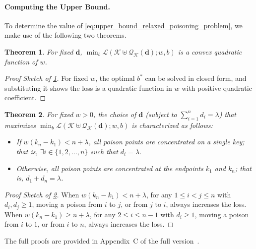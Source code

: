 \documentclass[acmsmall]{acmart}
\newtheorem{theorem}{Theorem}
\begin{document}
\paragraph{Computing the Upper Bound.}
To determine the value of \cref{eq:upper_bound_relaxed_poisoning_problem}, we make use of the following two theorems.
\begin{theorem_box}
\begin{theorem}
\label{thm:convexity_of_min_b_l_fixed_d}
For fixed $\bm{d}$,  $\min_{b} \mathcal{L}(\mathcal{K} \uplus \mathcal{Q}_\mathcal{K}(\bm{d}); w, b)$ is a convex quadratic function of $w$.
\end{theorem}
\end{theorem_box}
\begin{proof}[Proof Sketch of \cref{thm:convexity_of_min_b_l_fixed_d}]
    For fixed $w$, the optimal $b^\ast$ can be solved in closed form, and substituting it shows the loss is a quadratic function in $w$ with positive quadratic coefficient.
\end{proof}
\begin{theorem_box}
\begin{theorem}
\label{thm:optimal_c_for_fixed_w}
    For fixed $w > 0$, the choice of $\bm{d}$ (subject to $\sum_{i=1}^{n} d_i = \lambda$) that maximizes $\min_{b} \mathcal{L}(\mathcal{K} \uplus \mathcal{Q}_\mathcal{K}(\bm{d}); w, b)$ is characterized as follows:
    \begin{itemize}[leftmargin=1.5em]
        \item If $w (k_n - k_1) < n + \lambda$, all poison points are concentrated on a single key; that is, $\exists i \in \{1, 2, \dots, n\}$ such that $d_i = \lambda$.
        \item Otherwise, all poison points are concentrated at the endpoints $k_1$ and $k_n$; that is, $d_1 + d_n = \lambda$.
    \end{itemize}
\end{theorem}
\end{theorem_box}
\begin{proof}[Proof Sketch of \cref{thm:optimal_c_for_fixed_w}]
    When $w(k_n - k_1) < n+\lambda$, for any $1\leq i < j \leq n$ with $d_i,d_j \geq 1$, moving a poison from $i$ to $j$, or from $j$ to $i$, always increases the loss.
    When $w(k_n - k_1) \geq n+\lambda$, for any $2\leq i \leq n-1$ with $d_i \geq 1$, moving a poison from $i$ to $1$, or from $i$ to $n$, always increases the loss.
\end{proof}
The full proofs are provided in Appendix~C of the full version~\cite{sato2026mathematical_arxiv}.
\end{document}
